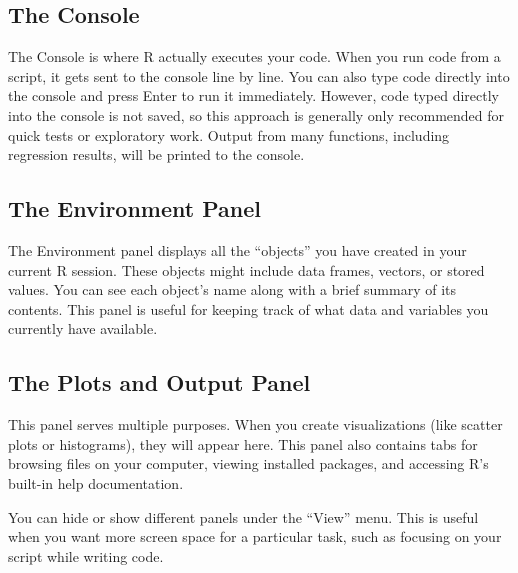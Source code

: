 \documentclass[
  letterpaper,
  DIV=11,
  numbers=noendperiod]{scrreprt}
\begin{document}
\subsection{The Console}\label{the-console}

The Console is where R actually executes your code. When you run code
from a script, it gets sent to the console line by line. You can also
type code directly into the console and press Enter to run it
immediately. However, code typed directly into the console is not saved,
so this approach is generally only recommended for quick tests or
exploratory work. Output from many functions, including regression
results, will be printed to the console.

\subsection{The Environment Panel}\label{the-environment-panel}

The Environment panel displays all the ``objects'' you have created in
your current R session. These objects might include data frames,
vectors, or stored values. You can see each object's name along with a
brief summary of its contents. This panel is useful for keeping track of
what data and variables you currently have available.

\subsection{The Plots and Output
Panel}\label{the-plots-and-output-panel}

This panel serves multiple purposes. When you create visualizations
(like scatter plots or histograms), they will appear here. This panel
also contains tabs for browsing files on your computer, viewing
installed packages, and accessing R's built-in help documentation.

\begin{tcolorbox}[enhanced jigsaw, arc=.35mm, bottomrule=.15mm, bottomtitle=1mm, breakable, colback=white, colbacktitle=quarto-callout-tip-color!10!white, colframe=quarto-callout-tip-color-frame, coltitle=black, left=2mm, leftrule=.75mm, opacityback=0, opacitybacktitle=0.6, rightrule=.15mm, title=\textcolor{quarto-callout-tip-color}{\faLightbulb}\hspace{0.5em}{Customizing Your Layout}, titlerule=0mm, toprule=.15mm, toptitle=1mm]

You can hide or show different panels under the ``View'' menu. This is
useful when you want more screen space for a particular task, such as
focusing on your script while writing code.

\end{tcolorbox}
\end{document}
